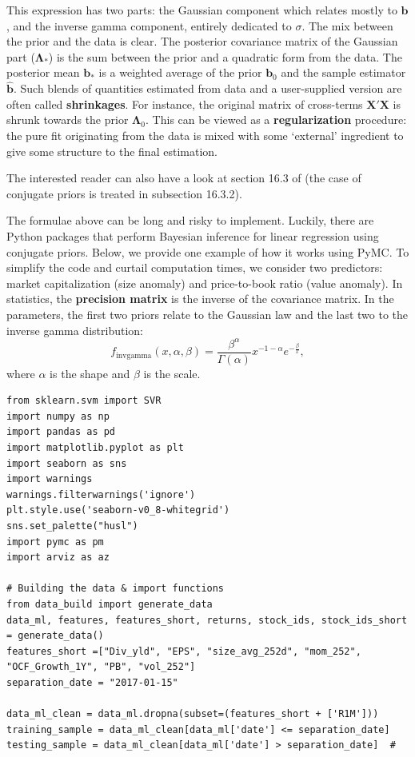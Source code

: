 This expression has two parts: the Gaussian component which relates mostly to $\textbf{b}$, and the inverse gamma component, entirely dedicated to $\sigma$. The mix between the prior and the data is clear. The posterior covariance matrix of the Gaussian part ($\boldsymbol{\Lambda}_*$) is the sum between the prior and a quadratic form from the data. The posterior mean $\textbf{b}_*$ is a weighted average of the prior $\textbf{b}_0$ and the sample estimator $\hat{\textbf{b}}$. Such blends of quantities estimated from data and a user-supplied version are often called \textbf{shrinkages}. For instance, the original matrix of cross-terms $\textbf{X}'\textbf{X}$ is shrunk towards the prior $\boldsymbol{\Lambda}_0$. This can be viewed as a \textbf{regularization} procedure: the pure fit originating from the data is mixed with some `external' ingredient to give some structure to the final estimation.

The interested reader can also have a look at section 16.3 of \cite{greene2018econometric} (the case of conjugate priors is treated in subsection 16.3.2).

The formulae above can be long and risky to implement. Luckily, there are Python packages that perform Bayesian inference for linear regression using conjugate priors. Below, we provide one example of how it works using PyMC. To simplify the code and curtail computation times, we consider two predictors: market capitalization (size anomaly) and price-to-book ratio (value anomaly). In statistics, the \textbf{precision matrix} is the inverse of the covariance matrix. In the parameters, the first two priors relate to the Gaussian law and the last two to the inverse gamma distribution:
\begin{equation}
f_\text{invgamma}(x, \alpha, \beta)=\frac{\beta^\alpha}{\Gamma(\alpha)}x^{-1-\alpha}e^{-\frac{\beta}{x}},
\end{equation}
where $\alpha$ is the shape and $\beta$ is the scale.

\begin{verbatim}
from sklearn.svm import SVR
import numpy as np
import pandas as pd
import matplotlib.pyplot as plt
import seaborn as sns
import warnings
warnings.filterwarnings('ignore')
plt.style.use('seaborn-v0_8-whitegrid')
sns.set_palette("husl")
import pymc as pm
import arviz as az

# Building the data & import functions
from data_build import generate_data
data_ml, features, features_short, returns, stock_ids, stock_ids_short = generate_data()
features_short =["Div_yld", "EPS", "size_avg_252d", "mom_252", "OCF_Growth_1Y", "PB", "vol_252"]
separation_date = "2017-01-15"

data_ml_clean = data_ml.dropna(subset=(features_short + ['R1M']))
training_sample = data_ml_clean[data_ml['date'] <= separation_date]
testing_sample = data_ml_clean[data_ml['date'] > separation_date]  #
\end{verbatim}

